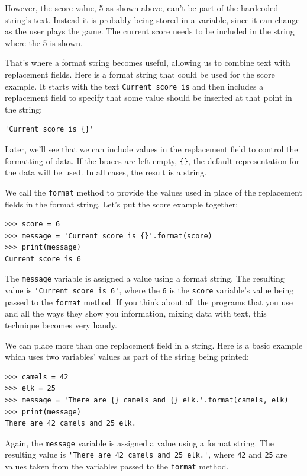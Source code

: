 However, the score value, 5 as shown above, can't be part of the hardcoded string's text. Instead it is probably being stored in a variable, since it can change as the user plays the game. The current score needs to be included in the string where the 5 is shown.

That's where a format string becomes useful, allowing us to combine text with replacement fields. Here is a format string that could be used for the score example. It starts with the text {\tt Current score is} and then includes a replacement field to specify that some value should be inserted at that point in the string:

\beforeverb
\begin{verbatim}
'Current score is {}'
\end{verbatim}
\afterverb


Later, we'll see that we can include values in the replacement field to control the formatting of data. If the braces are left empty, {\tt \{\}}, the default representation for the data will be used. In all cases, the result is a string.

We call the {\tt format} method to provide the values used in place of the replacement fields in the format string. Let's put the score example together:

\beforeverb
\begin{verbatim}
>>> score = 6
>>> message = 'Current score is {}'.format(score)
>>> print(message)
Current score is 6
\end{verbatim}
\afterverb

The {\tt message} variable is assigned a value using a format string. The resulting value is \verb"'Current score is 6'", where the {\tt 6} is the {\tt score} variable's value being passed to the {\tt format} method. If you think about all the programs that you use and all the ways they show you information, mixing data with text, this technique becomes very handy.

We can place more than one replacement field in a string. Here is a basic example which uses two variables' values as part of the string being printed:

\beforeverb
\begin{verbatim}
>>> camels = 42
>>> elk = 25
>>> message = 'There are {} camels and {} elk.'.format(camels, elk)
>>> print(message)
There are 42 camels and 25 elk.
\end{verbatim}
\afterverb
%
Again, the {\tt message} variable is assigned a value using a format string. The resulting value is \verb"'There are 42 camels and 25 elk.'", where {\tt 42} and {\tt 25} are values taken from the variables passed to the {\tt format} method.

